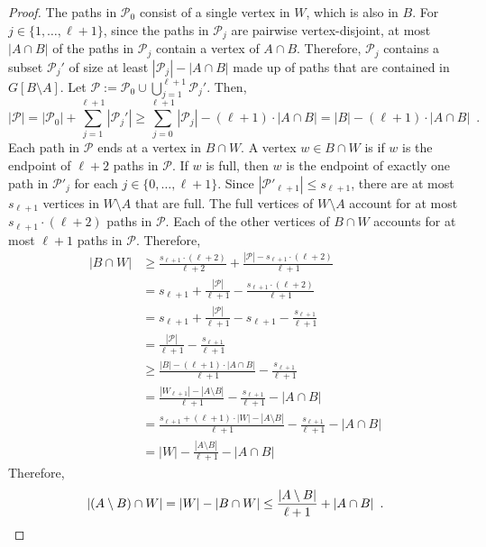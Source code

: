 \documentclass{patmorin}
\begin{document}
\begin{proof}
  The paths in $\mathcal{P}_0$ consist of a single vertex in $W$, which is also in $B$.
  For $j\in\{1,\ldots,\ell+1\}$, since the paths in $\mathcal{P}_j$ are pairwise vertex-disjoint, at most $|A\cap B|$ of the paths in $\mathcal{P}_j$ contain a vertex of $A\cap B$.  Therefore, $\mathcal{P}_j$ contains a subset $\mathcal{P}_j'$ of size at least $|\mathcal{P}_j|-|A\cap B|$ made up of paths that are contained in $G[B\setminus A]$.  Let $\mathcal{P}:=\mathcal{P}_0\cup \bigcup_{j=1}^{\ell+1} \mathcal{P}_j'$. Then,
  \[
    |\mathcal{P}|=|\mathcal{P}_0|+\sum_{j=1}^{\ell+1}|\mathcal{P}_j'| \ge \sum_{j=0}^{\ell+1}|\mathcal{P}_j| - (\ell+1)\cdot|A\cap B|
    = |B|-(\ell+1)\cdot|A\cap B| \enspace .
  \]
  Each path in $\mathcal{P}$ ends at a vertex in $B\cap W$.  A vertex $w\in B\cap W$ is  if $w$ is the endpoint of $\ell+2$ paths in $\mathcal{P}$.  If $w$ is full, then $w$ is the endpoint of exactly one path in $\mathcal{P}'_j$ for each $j\in\{0,\ldots,\ell+1\}$.  Since $|\mathcal{P}'_{\ell+1}|\le s_{\ell+1}$, there are at most $s_{\ell+1}$ vertices in $W\setminus A$ that are full.  The full vertices of $W\setminus A$ account for at most $s_{\ell+1}\cdot (\ell+2)$ paths in $\mathcal{P}$. Each of the other vertices of $B\cap W$ accounts for at most $\ell+1$ paths in $\mathcal{P}$.  Therefore,
  \begin{align*}
     |B\cap W| 
     & \ge \frac{s_{\ell+1}\cdot (\ell+2)}{\ell+2} + \frac{|\mathcal{P}|-s_{\ell+1}\cdot(\ell+2)}{\ell+1} \\
     & = s_{\ell+1} + \frac{|\mathcal{P}|}{\ell+1}-\frac{s_{\ell+1}\cdot(\ell+2)}{\ell+1} \\
     & = s_{\ell+1} + \frac{|\mathcal{P}|}{\ell+1}-s_{\ell+1}
     - \frac{s_{\ell+1}}{\ell+1}\\
     & = \frac{|\mathcal{P}|}{\ell+1}
     - \frac{s_{\ell+1}}{\ell+1}\\
     & \ge \frac{|B|-(\ell+1)\cdot|A\cap B|}{\ell+1}
     - \frac{s_{\ell+1}}{\ell+1}\\
     & = \frac{|W_{\ell+1}|-|A\setminus B|}{\ell+1}
     - \frac{s_{\ell+1}}{\ell+1} - |A\cap B|\\
     & = \frac{s_{\ell+1}+(\ell+1)\cdot|W|-|A\setminus B|}{\ell+1}
     - \frac{s_{\ell+1}}{\ell+1} - |A\cap B|\\
     & = |W|-\frac{|A\setminus B|}{\ell+1}-|A\cap B|
  \end{align*}
  Therefore,
  \[
    |(A\setminus B)\cap W|=|W|-|B\cap W|\le \frac{|A\setminus B|}{\ell+1}+ |A\cap B| \enspace . \qedhere
  \]
\end{proof}
\end{document}
